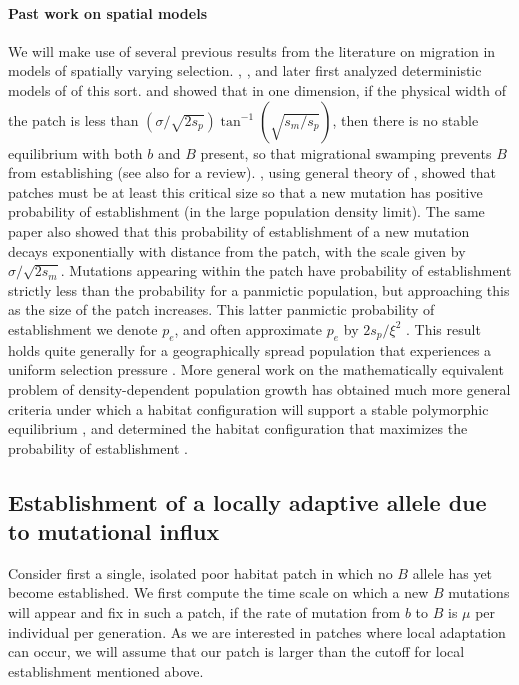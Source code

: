 \documentclass{article}
\newcommand{\citep}[1]{\cite{#1}}
\newcommand{\citet}[1]{\cite{#1}}
\begin{document}
\paragraph{Past work on spatial models}
We will make use of several previous results from the literature on
migration in models of spatially varying selection.
\citet{haldane1948theory}, \citet{fisher1950frequencies}, and later \citet{slatkin1973geneflow} first analyzed
deterministic models of of this sort.
\citet{nagylaki1975conditions} and \citet{conley1975application} showed that in one dimension, if the physical width of the patch is less than $(\sigma/\sqrt{2s_p}) \tan^{-1} (\sqrt{s_m/s_p})$, 
then there is no stable equilibrium with both $b$ and $B$ present,  %
so that migrational swamping prevents $B$ from establishing (see also \citet{lenormand2002limits} for a review).
\citet{barton1987establishment}, using general theory of \citet{pollak1966survival}, showed  
that patches must be at least this critical size so that a new mutation has positive probability of establishment
(in the large population density limit).
The same paper also showed that
this probability of establishment of a new mutation decays exponentially with distance from the patch, 
with the scale given by $\sigma/\sqrt{2s_m}$. 
Mutations appearing within the patch have probability of establishment
strictly less than the probability for a panmictic population,
but approaching this as the size of the patch increases.
This latter panmictic probability of establishment we denote $p_e$,
and often approximate $p_e$ by $2 s_p / \xi^2$ \citep{haldane1927mathematical,fisher1930genetical}.
This result holds quite generally for a geographically spread population that experiences a uniform selection
pressure \citep{maruyama1970fixation,cherry2003diffusion}. 
More general work on the mathematically equivalent problem of density-dependent population growth 
has obtained much more general criteria
under which a habitat configuration will support a stable polymorphic equilibrium \citep{cantrell1989diffusive},
and determined the habitat configuration that maximizes the probability of establishment \citep{lou2006minimization}.


\subsection[Establishment by Mutation]{Establishment of a locally adaptive allele due to mutational influx}
\label{ss:patchymutation}

Consider first a single, isolated poor habitat patch in which no $B$ allele has yet become established. 
We first compute the time scale on which a new $B$ mutations will appear and fix in such a patch,
if the rate of mutation from $b$ to $B$ is $\mu$ per individual per generation.
As we are interested in patches where local adaptation can occur,
we will assume that our patch is larger than the cutoff for local establishment 
mentioned above.
\end{document}
